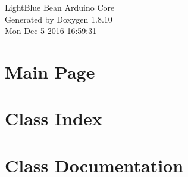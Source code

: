 \documentclass[twoside]{book}
\newcommand{\+}{\discretionary{\mbox{\scriptsize$\hookleftarrow$}}{}{}}
\newcommand{\clearemptydoublepage}{%
  \newpage{\pagestyle{empty}\cleardoublepage}%
}
\begin{document}
\hypersetup{pageanchor=false,
             bookmarks=true,
             bookmarksnumbered=true,
             pdfencoding=unicode
            }
\begin{titlepage}
\vspace*{7cm}
\begin{center}%
{\Large Light\+Blue Bean Arduino Core }\\
\vspace*{1cm}
{\large Generated by Doxygen 1.8.10}\\
\vspace*{0.5cm}
{\small Mon Dec 5 2016 16:59:31}\\
\end{center}
\end{titlepage}
\clearemptydoublepage
\tableofcontents
\clearemptydoublepage
{}
\hypersetup{pageanchor=true}

\chapter{Main Page}
\label{index}\hypertarget{index}{}
\chapter{Class Index}

\chapter{Class Documentation}




























\backmatter
\newpage
{}
\clearemptydoublepage
{}
\printindex
\end{document}
